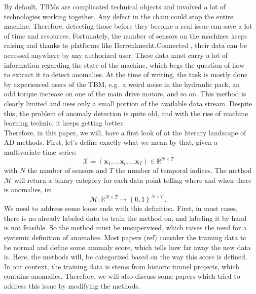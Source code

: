 \documentclass[../../main/main.tex]{subfiles}
\begin{document}

    By default, \acp{TBM} are complicated technical objects and involved a lot of technologies working together. Any defect in the chain
    could stop the entire machine. Therefore, detecting those before they become a real issue can save a lot of time and resources. Fortunately, the number
    of sensors on the machines keeps raising and thanks to platforms like Herrenknecht.Connected \cite{HKC.2024}, their data can be accessed anywhere by any authorized user. These data
    must carry a lot of information regarding the state of the machine, which begs the question of how to extract it to detect anomalies. At the time of writing,
    the task is mostly done by experienced users of the \ac{TBM}, e.g.~a weird noise in the hydraulic pack, an odd torque increase on one of the main drive motors,
    and so on. This method is clearly limited and uses only a small portion of the available data stream. Despite this, the problem of anomaly detection is quite
    old, and with the rise of machine learning technic, it keeps getting better. \\
    Therefore, in this paper, we will, have a first look of at the literary landscape of \ac{AD} methods. First, let's define exactly what we mean by that, given a multivariate time series: 
    \begin{equation}
        \mathcal{X} = (\textbf{x}_1, \dots \textbf{x}_t, \dots \textbf{x}_T) \in \mathbb{R}^{N \times T}
    \end{equation}
    with $N$ the number of sensors and $T$ the number of temporal indices. The method $\mathcal{M} $ will return a binary category for each data point 
    telling where and when there is anomalies, ie:
    \begin{equation}
        \mathcal{M} : \mathbb{R}^{N \times T} \to \left\{0, 1\right\} ^{N \times T} \, .
    \end{equation}
    We need to address some loose ends with this definition. First, in most cases, there is no already labeled data to train the method on, and labeling it
    by hand is not feasible. So the method must be unsupervised, which raises the need for a systemic definition of anomalies. Most papers (ref) consider the
    training data to be normal and define some anomaly score, which tells how far away the new data is. Here, the methods will, be categorized based on the way
    this score is defined.\\
    In our context, the training data is stems from historic tunnel projects, which contains anomalies. Therefore, we will also discuss some papers which tried to
    address this issue by modifying the methods. 
\end{document}
